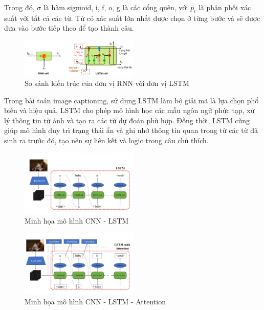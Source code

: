 \documentclass[conference]{IEEEtran}
\begin{document}
Trong đó, $\sigma$ là hàm sigmoid, i, f, o, g là các cổng quên, với $p_t$ là phân phối xác suất với tất cả các từ. Từ có xác suất lớn nhất được chọn ở từng bước và sẽ được đưa vào bước tiếp theo để tạo thành câu. 

\begin{figure}[h]
\includegraphics[width=0.5\textwidth]{assets/RNN_LSTM_compare.png}
  \caption{So sánh kiến trúc của đơn vị RNN với đơn vị LSTM}
  \label{fig:RNN_LSTM_compare}
\end{figure}

Trong bài toán image captioning, sử dụng LSTM làm bộ giải mã là lựa chọn phổ biến và hiệu quả.
LSTM cho phép mô hình học các mẫu ngôn ngữ phức tạp, xử lý thông tin từ ảnh và tạo ra các từ dự đoán phù hợp.
Đồng thời, LSTM cũng giúp mô hình duy trì trạng thái ẩn và ghi nhớ thông tin quan trọng từ các từ đã sinh ra trước đó, tạo nên sự liên kết và logic trong câu chú thích.

\begin{figure}[h]
\includegraphics[width=0.5\textwidth]{assets/cnnlstm.jpg}
  \caption{Minh họa mô hình CNN - LSTM}
  \label{fig:CNN_LSTM}
\end{figure}

\begin{figure}[h]
\includegraphics[width=0.5\textwidth]{assets/cnnlstmattention.png}
  \caption{Minh họa mô hình CNN - LSTM - Attention}
  \label{fig:CNN_LSTM_Attention}
\end{figure}
\end{document}
